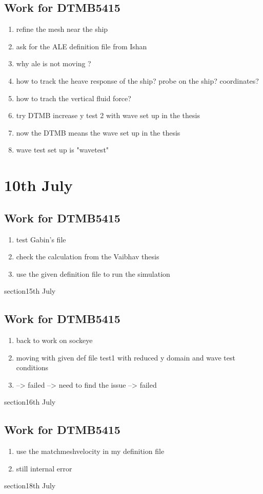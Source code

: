 \documentclass[12pt]{article} %
\begin{document}
\subsection{Work for DTMB5415}
\begin{enumerate}
    \item refine the mesh near the ship
    \item ask for the ALE definition file from Ishan
    \item why ale is not moving ?
    \item how to track the heave response of the ship? probe on the ship? coordinates?
    \item how to trach the vertical fluid force? 
    \item try DTMB increase y test 2 with wave set up in the thesis
    \item now the DTMB means the wave set up in the thesis
    \item wave test set up is "wavetest"
\end{enumerate}
\section{10th July}
\subsection{Work for DTMB5415}
\begin{enumerate}
    \item test Gabin's file
    \item check the calculation from the Vaibhav thesis
    \item use the given definition file to run the simulation
\end{enumerate}
section{15th July}
\subsection{Work for DTMB5415}
\begin{enumerate}
    \item back to work on sockeye
    \item moving with given def file test1 with reduced y domain and wave test conditions
    \item --> failed --> need to find the issue --> failed 
\end{enumerate}
section{16th July}
\subsection{Work for DTMB5415}
\begin{enumerate}
    \item use the matchmeshvelocity in my definition file       
    \item still internal error  
\end{enumerate}
section{18th July}
\end{document}

